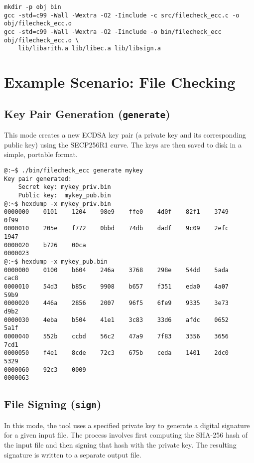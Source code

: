 \begin{lstlisting}[numbers=none]
mkdir -p obj bin
gcc -std=c99 -Wall -Wextra -O2 -Iinclude -c src/filecheck_ecc.c -o obj/filecheck_ecc.o
gcc -std=c99 -Wall -Wextra -O2 -Iinclude -o bin/filecheck_ecc obj/filecheck_ecc.o \
	lib/libarith.a lib/libec.a lib/libsign.a
\end{lstlisting}

\section{Example Scenario: File Checking}
\subsection{Key Pair Generation (\texttt{generate})}
This mode creates a new ECDSA key pair (a private key and its corresponding public key) using the SECP256R1 curve. The keys are then saved to disk in a simple, portable format.
\begin{lstlisting}[numbers=none]
@:~$ ./bin/filecheck_ecc generate mykey
Key pair generated:
	Secret key: mykey_priv.bin
	Public key:  mykey_pub.bin
@:~$ hexdump -x mykey_priv.bin 
0000000    0101    1204    98e9    ffe0    4d0f    82f1    3749    0f99
0000010    205e    f772    0bbd    74db    dadf    9c09    2efc    1947
0000020    b726    00ca                                                
0000023
@:~$ hexdump -x mykey_pub.bin 
0000000    0100    b604    246a    3768    298e    54dd    5ada    cac8
0000010    54d3    b85c    9908    b657    f351    eda0    4a07    59b9
0000020    446a    2856    2007    96f5    6fe9    9335    3e73    d9b2
0000030    4eba    b504    41e1    3c83    33d6    afdc    0652    5a1f
0000040    552b    ccbd    56c2    47a9    7f83    3356    3656    7cd1
0000050    f4e1    8cde    72c3    675b    ceda    1401    2dc0    5329
0000060    92c3    0009                                                
0000063
\end{lstlisting}
\subsection{File Signing (\texttt{sign})}
In this mode, the tool uses a specified private key to generate a digital signature for a given input file. The process involves first computing the SHA-256 hash of the input file and then signing that hash with the private key. The resulting signature is written to a separate output file.

